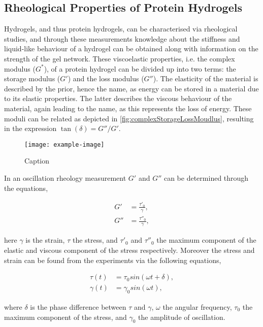 \subsection{Rheological Properties of Protein Hydrogels}
Hydrogels, and thus protein hydrogels, can be characterised via rheological studies, and through these measurements knowledge about the stiffness and liquid-like behaviour of a hydrogel can be obtained along with information on the strength of the gel network. These viscoelastic properties, i.e. the complex modulus ($G^*$), of a protein hydrogel can be divided up into two terms: the storage modulus ($G'$) and the loss modulus ($G''$). The elasticity of the material is described by the prior, hence the name, as energy can be stored in a material due to its elastic properties. The latter describes the viscous behaviour of the material, again leading to the name, as this represents the loss of energy. These moduli can be related as depicted in \autoref{fig:complexStorageLossMoudlus}, resulting in the expression $\tan(\delta) = G''/G'$. \parencite{PanahiReza2019ProteinHydrogels}
\par
%
\begin{figure}[tbp]
    \centering
    \texttt{[image: example-image]}
    \caption{Caption}
    \label{fig:complexStorageLossMoudlus}
\end{figure}
%
In an oscillation rheology measurement $G'$ and $G''$ can be determined through the equations,
\par
%
\begin{align*}
    G' &= \frac{\tau'_{0}}{\gamma},\\
    G'' &= \frac{\tau''_{0}}{\gamma},
\end{align*}
\par
%
\noindent here $\gamma$ is the strain, $\tau$ the stress, and $\tau'_{0}$ and $\tau''_{0}$ the maximum component of the elastic and viscous component of the stress respectively. Moreover the stress and strain can be found from the experiments via the following equations,
\par
%
\begin{align*}
    \tau(t) &= \tau_0 sin(\omega t + \delta),\\
    \gamma(t) &= \gamma_0 sin(\omega t) ,
\end{align*}
\par
%
\noindent where $\delta$ is the phase difference between $\tau$ and $\gamma$, $\omega$ the angular frequency, $\tau_0$ the maximum component of the stress, and $\gamma_0$ the amplitude of oscillation.
